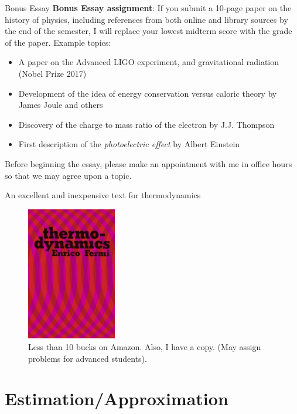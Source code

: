\documentclass{beamer}
\begin{document}
\begin{frame}{Bonus Essay}
\small
\textbf{\alert{Bonus Essay assignment}}: If you submit a 10-page paper on the history of physics, including references from both online and library sources by the end of the semester, I will replace your lowest midterm score with the grade of the paper.  Example topics:
\begin{itemize}
\item A paper on the Advanced LIGO experiment, and gravitational radiation (Nobel Prize 2017)
\item Development of the idea of energy conservation versus caloric theory by James Joule and others
\item Discovery of the charge to mass ratio of the electron by J.J. Thompson
\item First description of the \textit{photoelectric effect} by Albert Einstein
\end{itemize}
Before beginning the essay, please make an appointment with me in office hours so that we may agree upon a topic.
\end{frame}

\begin{frame}{An excellent and inexpensive text for thermodynamics}
\begin{figure}
\centering
\includegraphics[width=0.35\textwidth]{figures/fermi.jpg}
\caption{Less than 10 bucks on Amazon.  Also, I have a copy.  (May assign problems for advanced students).}
\end{figure}
\end{frame}

\section{Estimation/Approximation}
\end{document}
